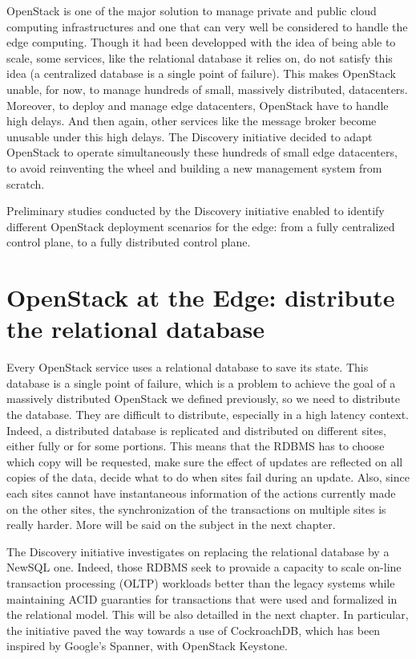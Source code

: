 OpenStack is one of the major solution to manage private and public cloud computing infrastructures and one that can very well be considered to handle the edge computing. Though it had been developped with the idea of being able to scale, some services, like the relational database it relies on, do not satisfy this idea (a centralized database is a single point of failure). This makes OpenStack unable, for now, to manage hundreds of small, massively distributed, datacenters. Moreover, to deploy and manage edge datacenters, OpenStack have to handle high delays. And then again, other services like the message broker become unusable under this high delays. The Discovery initiative decided to adapt OpenStack to operate simultaneously these hundreds of small edge datacenters, to avoid reinventing the wheel and building a new management system from scratch.

Preliminary studies conducted by the Discovery initiative enabled to identify different OpenStack deployment scenarios for the edge: from a fully centralized control plane, to a fully distributed control plane\cite{cherrueau:hal-01812747}.


\section{OpenStack at the Edge: distribute the relational database}

Every OpenStack service uses a relational database to save its state. This database is a single point of failure, which is a problem to achieve the goal of a massively distributed OpenStack we defined previously, so we need to distribute the database. They are difficult to distribute, especially in a high latency context. Indeed, a distributed database is replicated and distributed on different sites, either fully or for some portions. This means that the RDBMS has to choose which copy will be requested, make sure the effect of updates are reflected on all copies of the data, decide what to do when sites fail during an update. Also, since each sites cannot have instantaneous information of the actions currently made on the other sites, the synchronization of the transactions on multiple sites is really harder\cite{OezsuValduriez2011}. More will be said on the subject in the next chapter.

The Discovery initiative investigates on replacing the relational database by a NewSQL one. Indeed, those RDBMS seek to provaide a capacity to scale on-line transaction processing (OLTP) workloads better than the legacy systems while maintaining ACID guaranties for transactions that were used and formalized in the relational model\cite{DBLP:journals/sigmod/PavloA16}. This will be also detailled in the next chapter. In particular, the initiative paved the way towards a use of CockroachDB, which has been inspired by Google's Spanner\cite{CRDB:HLC}, with OpenStack Keystone.

